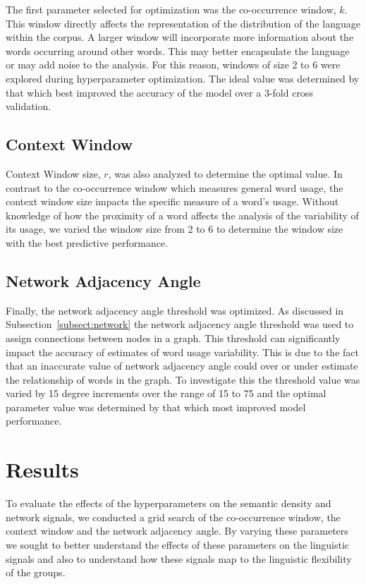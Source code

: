 \documentclass[11pt, a4paper]{article}
\begin{document}
The first parameter selected for optimization was the co-occurrence window, $k$. This window directly affects the representation of the distribution of the language within the corpus. A larger window will incorporate more information about the words occurring around other words. This may better encapsulate the language or may add noise to the analysis. For this reason, windows of size 2 to 6 were explored during hyperparameter optimization. The ideal value was determined by that which best improved the accuracy of the model over a 3-fold cross validation.

\subsection{Context Window}
\label{sect:context window}

Context Window size, $r$, was also analyzed to determine the optimal value. In contrast to the co-occurrence window which measures general word usage, the context window size impacts the specific measure of a word's usage. Without knowledge of how the proximity of a word affects the analysis of the variability of its usage, we varied the window size from 2 to 6 to determine the window size with the best predictive performance.

\subsection{Network Adjacency Angle}
\label{sect:angle}

Finally, the network adjacency angle threshold was optimized. As discussed in Subsection~\ref{subsect:network} the network adjacency angle threshold was used to assign connections between nodes in a graph.  This threshold can significantly impact the accuracy of estimates of word usage variability. This is due to the fact that an inaccurate value of network adjacency angle could over or under estimate the relationship of words in the graph. To investigate this the threshold value was varied by 15 degree increments over the range of 15 to 75 and the optimal parameter value was determined by that which most improved model performance.

\section{Results}
\label{results}

To evaluate the effects of the hyperparameters on the semantic density and network signals, we conducted a grid search of the co-occurrence window, the context window and the network adjacency angle. By varying these parameters we sought to better understand the effects of these parameters on the linguistic signals and also to understand how these signals map to the linguistic flexibility of the  groups. 
\end{document}
